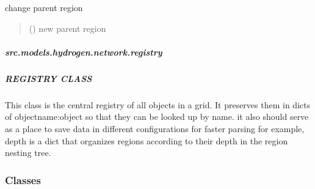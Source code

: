 \documentclass[letterpaper,10pt,english]{sphinxmanual}
\begin{document}
\begin{fulllineitems}
\begin{fulllineitems}
\label{\detokenize{src.models.hydrogen.network.region:src.models.hydrogen.network.region.Region.update_parent}}
\pysigstartsignatures
\pysiglinewithargsret
{}
{}
{}
\pysigstopsignatures
\sphinxAtStartPar
change parent region
\begin{quote}\begin{description}
\sphinxAtStartPar
{} ({\hyperref[\detokenize{src.models.hydrogen.network.region:src.models.hydrogen.network.region.Region}]{}}) \textendash{} new parent region

\end{description}\end{quote}

\end{fulllineitems}


\end{fulllineitems}


\sphinxstepscope


\subparagraph{src.models.hydrogen.network.registry}
\label{\detokenize{src.models.hydrogen.network.registry:module-src.models.hydrogen.network.registry}}\label{\detokenize{src.models.hydrogen.network.registry:src-models-hydrogen-network-registry}}\label{\detokenize{src.models.hydrogen.network.registry::doc}}

\subparagraph{REGISTRY CLASS}
\label{\detokenize{src.models.hydrogen.network.registry:registry-class}}
\sphinxAtStartPar
This class is the central registry of all objects in a grid. It preserves them in dicts of
object\sphinxhyphen{}name:object so that they can be looked up by name. it also should serve as a place to save
data in different configurations for faster parsing \sphinxhyphen{} for example, depth is a dict that organizes
regions according to their depth in the region nesting tree.
\subsubsection*{Classes}
\end{document}
